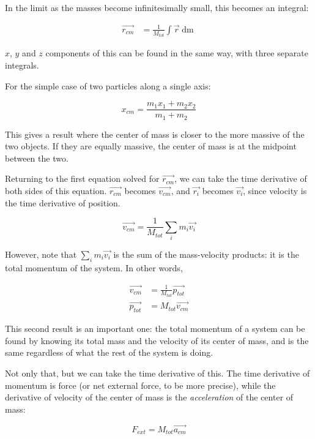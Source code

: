 In the limit as the masses become infinitesimally small, this becomes an integral:

\begin{align}
\vec{r_{cm}} &= \frac{1}{M_{tot}} \int \vec{r} \mathop{dm}
\end{align}

$x$, $y$ and $z$ components of this can be found in the same way, with three separate integrals.

For the simple case of two particles along a single axis:

\begin{equation}
x_{cm} = \frac{m_1 x_1 + m_2 x_2}{m_1 + m_2}
\end{equation}

This gives a result where the center of mass is closer to the more massive of the two objects. If they are equally massive, the center of mass is at the midpoint between the two.

Returning to the first equation solved for $\vec{r_{cm}}$, we can take the time derivative of both sides of this equation. $\vec{r_{cm}}$ becomes $\vec{v_{cm}}$, and $\vec{r_i}$ becomes $\vec{v_i}$, since velocity is the time derivative of position.

\begin{equation}
\vec{v_{cm}} = \frac{1}{M_{tot}} \sum_i m_i \vec{v_i}
\end{equation}

However, note that $\sum_i m_i \vec{v_i}$ is the sum of the mass-velocity products: it is the total momentum of the system. In other words,

\begin{align}
\vec{v_{cm}} &= \frac{1}{M_{tot}} \vec{p_{tot}}\\
\vec{p_{tot}} &= M_{tot} \vec{v_{cm}}
\end{align}

This second result is an important one: the total momentum of a system can be found by knowing its total mass and the velocity of its center of mass, and is the same regardless of what the rest of the system is doing.

Not only that, but we can take the time derivative of this. The time derivative of momentum is force (or net external force, to be more precise), while the derivative of velocity of the center of mass is the \emph{acceleration} of the center of mass:

\begin{equation}
F_{ext} = M_{tot} \vec{a_{cm}}
\end{equation}

